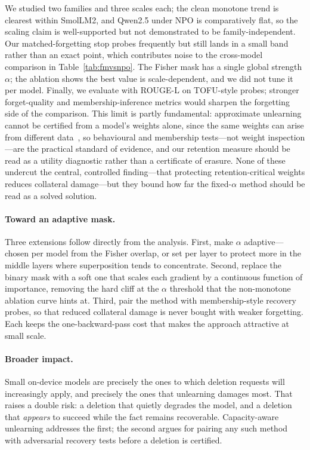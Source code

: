 \documentclass[sigconf,nonacm]{acmart}
\begin{document}
We studied two families and three scales each; the clean monotone trend is clearest within SmolLM2, and Qwen2.5 under NPO is comparatively flat, so the scaling claim is well-supported but not demonstrated to be family-independent. Our matched-forgetting stop probes frequently but still lands in a small band rather than an exact point, which contributes noise to the cross-model comparison in Table~\ref{tab:fmvsnpo}. The Fisher mask has a single global strength $\alpha$; the ablation shows the best value is scale-dependent, and we did not tune it per model. Finally, we evaluate with ROUGE-L on TOFU-style probes; stronger forget-quality and membership-inference metrics would sharpen the forgetting side of the comparison. This limit is partly fundamental: approximate unlearning cannot be certified from a model's weights alone, since the same weights can arise from different data~\cite{thudi}, so behavioural and membership tests---not weight inspection---are the practical standard of evidence, and our retention measure should be read as a utility diagnostic rather than a certificate of erasure. None of these undercut the central, controlled finding---that protecting retention-critical weights reduces collateral damage---but they bound how far the fixed-$\alpha$ method should be read as a solved solution.

\paragraph{Toward an adaptive mask.} Three extensions follow directly from the analysis. First, make $\alpha$ adaptive---chosen per model from the Fisher overlap, or set per layer to protect more in the middle layers where superposition tends to concentrate. Second, replace the binary mask with a soft one that scales each gradient by a continuous function of importance, removing the hard cliff at the $\alpha$ threshold that the non-monotone ablation curve hints at. Third, pair the method with membership-style recovery probes, so that reduced collateral damage is never bought with weaker forgetting. Each keeps the one-backward-pass cost that makes the approach attractive at small scale.

\paragraph{Broader impact.} Small on-device models are precisely the ones to which deletion requests will increasingly apply, and precisely the ones that unlearning damages most. That raises a double risk: a deletion that quietly degrades the model, and a deletion that \emph{appears} to succeed while the fact remains recoverable. Capacity-aware unlearning addresses the first; the second argues for pairing any such method with adversarial recovery tests before a deletion is certified.
\end{document}
